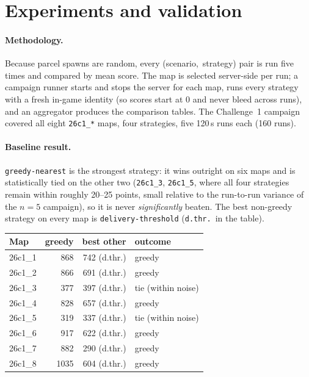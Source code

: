 \section{Experiments and validation}
\label{sec:experiments}

\paragraph{Methodology.} Because parcel spawns are random, every
(scenario,~strategy) pair is run five times and compared by mean score. The
map is selected server-side per run; a campaign runner starts and stops the
server for each map, runs every strategy with a fresh in-game identity (so
scores start at 0 and never bleed across runs), and an aggregator produces the
comparison tables. The Challenge~1 campaign covered all eight \texttt{26c1\_*}
maps, four strategies, five 120\,s runs each (160 runs).

\paragraph{Baseline result.} \texttt{greedy-nearest} is the strongest strategy:
it wins outright on six maps and is statistically tied on the other two
(\texttt{26c1\_3}, \texttt{26c1\_5}, where all four strategies remain within
roughly 20--25 points, small relative to the run-to-run variance of the $n{=}5$
campaign), so it is never \emph{significantly} beaten. The best non-greedy
strategy on every map is \texttt{delivery-threshold} (\texttt{d.thr.}\ in the
table).

\begin{center}\small
\begin{tabular}{@{}lrrl@{}}
\toprule
Map & greedy & best other & outcome \\
\midrule
26c1\_1 & 868 & 742 (d.thr.) & greedy \\
26c1\_2 & 866 & 691 (d.thr.) & greedy \\
26c1\_3 & 377 & 397 (d.thr.) & tie (within noise) \\
26c1\_4 & 828 & 657 (d.thr.) & greedy \\
26c1\_5 & 319 & 337 (d.thr.) & tie (within noise) \\
26c1\_6 & 917 & 622 (d.thr.) & greedy \\
26c1\_7 & 882 & 290 (d.thr.) & greedy \\
26c1\_8 & 1035 & 604 (d.thr.) & greedy \\
\bottomrule
\end{tabular}
\end{center}

